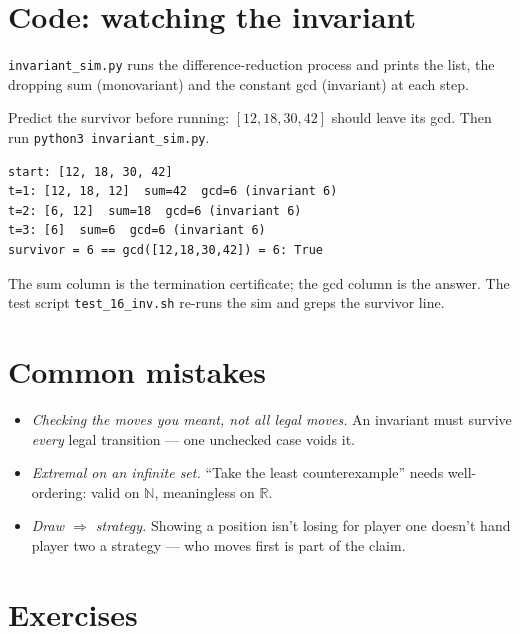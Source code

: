\section{Code: watching the invariant}\label{sec:invcode}
\texttt{invariant\_sim.py} runs the difference-reduction process and
prints the list, the dropping sum (monovariant) and the constant gcd
(invariant) at each step.
\begin{checkpoint}
Predict the survivor before running: $[12,18,30,42]$ should leave its
gcd. Then run \texttt{python3 invariant\_sim.py}.
\end{checkpoint}
\begin{lstlisting}
start: [12, 18, 30, 42]
t=1: [12, 18, 12]  sum=42  gcd=6 (invariant 6)
t=2: [6, 12]  sum=18  gcd=6 (invariant 6)
t=3: [6]  sum=6  gcd=6 (invariant 6)
survivor = 6 == gcd([12,18,30,42]) = 6: True
\end{lstlisting}
The sum column is the termination certificate; the gcd column is the
answer. The test script \texttt{test\_16\_inv.sh} re-runs the sim and
greps the survivor line.

\section{Common mistakes}
\begin{itemize}
\item \emph{Checking the moves you meant, not all legal moves.} An
invariant must survive \emph{every} legal transition --- one unchecked
case voids it.
\item \emph{Extremal on an infinite set.} ``Take the least counterexample''
needs well-ordering: valid on $\mathbb N$, meaningless on $\mathbb R$.
\item \emph{Draw $\Rightarrow$ strategy.} Showing a position isn't losing
for player one doesn't hand player two a strategy --- who moves first
is part of the claim.
\end{itemize}

\section*{Exercises}
